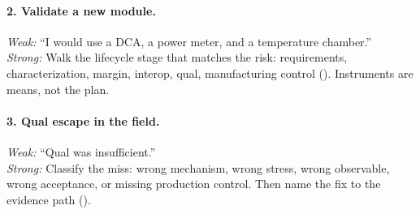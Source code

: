 \paragraph{2. Validate a new module.}
\textit{Weak:} ``I would use a DCA, a power meter, and a temperature chamber.''\\
\textit{Strong:} Walk the lifecycle stage that matches the risk: requirements,
characterization, margin, interop, qual, manufacturing control
(). Instruments are means, not the plan.

\paragraph{3. Qual escape in the field.}
\textit{Weak:} ``Qual was insufficient.''\\
\textit{Strong:} Classify the miss: wrong mechanism, wrong stress, wrong
observable, wrong acceptance, or missing production control. Then name the
fix to the evidence path ().

